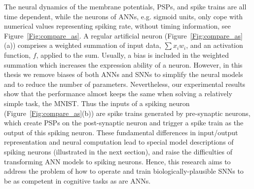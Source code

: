The neural dynamics of the membrane potentials, PSPs, and spike trains are all time dependent, while the neurons of ANNs, e.g. sigmoid units, only cope with numerical values representing spiking rate, without timing information, see Figure~\ref{Fig:compare_as}.
A regular artificial neuron (Figure~\ref{Fig:compare_as}(a)) comprises a weighted summation of input data, $\sum x_i w_i$, and an activation function, $f$, applied to the sum.
Usually, a bias is included in the weighted summation which increases the expression ability of a neuron.
However, in this thesis we remove biases of both ANNs and SNNs to simplify the neural models and to reduce the number of parameters.
Nevertheless, our experimental results show that the performance almost keeps the same when solving a relatively simple task, the MNIST. 
Thus the inputs of a spiking neuron (Figure~\ref{Fig:compare_as}(b)) are spike trains generated by pre-synaptic neurons, which create PSPs on the post-synaptic neuron and trigger a spike train as the output of this spiking neuron.
These fundamental differences in input/output representation and neural computation lead to special model descriptions of spiking neurons (illustrated in the next section), and raise the difficulties of transforming ANN models to spiking neurons.
Hence, this research aims to address the problem of how to operate and train biologically-plausible SNNs to be as competent in cognitive tasks as are ANNs.

